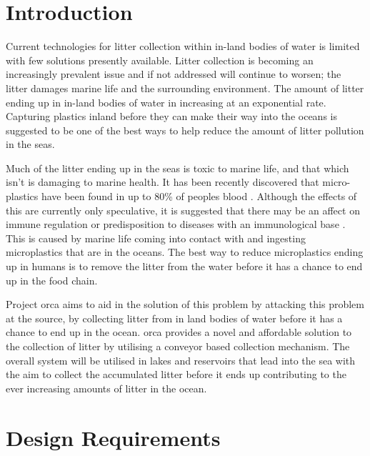 \documentclass [12pt]{article}
\begin{document}
		
\newpage			
{}
\setcounter{page}{1}
\tableofcontents 
\newpage

\listoffigures
\listoftables
\lstlistoflistings
\printglossaries

\newpage
\section{Introduction}
Current technologies for litter collection within in-land bodies of water is limited with few solutions presently available. Litter collection is becoming an increasingly prevalent issue and if not addressed will continue to worsen; the litter damages marine life and the surrounding environment. The amount of litter ending up in in-land bodies of water in increasing at an exponential rate. Capturing plastics inland before they can make their way into the oceans is suggested to be one of the best ways to help reduce the amount of litter pollution in the seas.

Much of the litter ending up in the seas is toxic to marine life, and that which isn't is damaging to marine health. It has been recently discovered that micro-plastics have been found in up to 80\% of peoples blood \cite{microplastics}. Although the effects of this are currently only speculative, it is suggested that there may be an affect on immune regulation or predisposition to diseases with an immunological base \cite{human_health_microplastics}. This is caused by marine life coming into contact with and ingesting microplastics that are in the oceans. The best way to reduce microplastics ending up in humans is to remove the litter from the water before it has a chance to end up in the food chain. 

Project \gls{orca} aims to aid in the solution of this problem by attacking this problem at the source, by collecting litter from in land bodies of water before it has a chance to end up in the ocean. \gls{orca} provides a novel and affordable solution to the collection of litter by utilising a conveyor based collection mechanism. The overall system will be utilised in lakes and reservoirs that lead into the sea with the aim to collect the accumulated litter before it ends up contributing to the ever increasing amounts of litter in the ocean. 


\section{Design Requirements}
\end{document}
